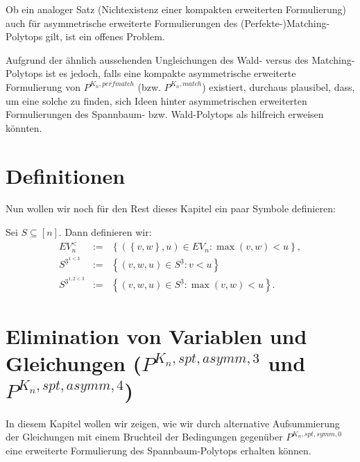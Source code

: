 \documentclass[10p,a4paper,BCOR = 12mm, DIV=15]{scrbook}
\begin{document}
Ob ein analoger Satz (Nichtexistenz einer kompakten erweiterten Formulierung) auch für asymmetrische erweiterte Formulierungen des (Perfekte-)Matching-Polytops gilt, ist ein offenes Problem.

Aufgrund der ähnlich aussehenden Ungleichungen des Wald- versus des Matching-Polytops ist es jedoch, falls eine kompakte asymmetrische erweiterte Formulierung von $P^{K_n, perfmatch}$ (bzw. $P^{K_n, match}$) existiert, durchaus plausibel, dass, um eine solche zu finden, sich Ideen hinter asymmetrischen erweiterten Formulierungen des Spannbaum- bzw. Wald-Polytops als hilfreich erweisen könnten.

\section{Definitionen}

Nun wollen wir noch für den Rest dieses Kapitel ein paar Symbole definieren:

\begin{Def}
Sei $S\subseteq \left[n\right]$. Dann definieren wir:
\begin{eqnarray*}
EV_n^{<} & := & \left\{\left(\left\{v, w\right\}, u\right) \in EV_n: \max\left(v, w\right) < u\right\}, \\
S^{\underline{3}^{1<3}} & := & \left\{\left(v, w, u\right) \in S^{\underline{3}}: v<u\right\} \\
S^{\underline{3}^{1,2<3}} & := & \left\{\left(v, w, u\right) \in S^{\underline{3}}: \max\left(v, w\right) < u\right\}.
\end{eqnarray*}
\end{Def}

\section{Elimination von Variablen und Gleichungen ($P^{K_n, spt, asymm, 3}$ und $P^{K_n, spt, asymm, 4}$)}

In diesem Kapitel wollen wir zeigen, wie wir durch alternative Aufsummierung der Gleichungen mit einem Bruchteil der Bedingungen gegenüber $P^{K_n, spt, symm, 0}$ eine erweiterte Formulierung des Spannbaum-Polytops erhalten können.
\end{document}
